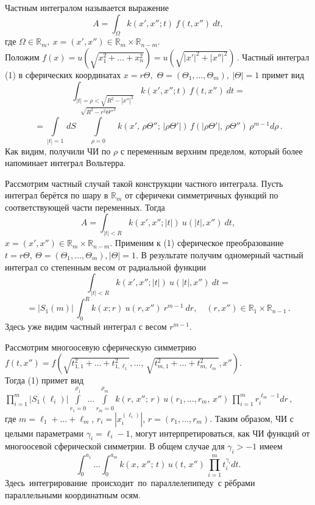 
\vzmscaption

Частным интегралом называется выражение
\begin{equation}\label{1}
A=\int_{\Omega}k(x',x''; t)~f(t,x'')~dt,
\end{equation}
где $\Omega\in\mathbb{R}_m,~x=(x',x'')\in\mathbb{R}_{m}\times\mathbb{R}_{n-m}$.\\
Положим
$
f(x)=u\left(\sqrt{x_1^2+\ldots+x_n^2}\right)=
u\left(\sqrt{|x'|^2+|x''|^2}\right)\,.
$
Частный интеграл (1) в сферических координатах
$ x=r\Theta,$ $\Theta=(\Theta_1,\ldots,\Theta_m),~|\Theta|=1$
примет вид
$$
\int_{|t|=\rho<\sqrt{R^2-|x''|^2}}k(x',x''; t)~f(t,x'')~dt=
$$
$$=
\int\limits_{|t|=1} \,dS\,\,\int\limits_{\rho=0}^{\sqrt{R^2-r^2\Theta''^2}} k(x',\,\rho\Theta'';\, |\rho\Theta'|)\, f(|\rho\Theta'|,\, \rho\Theta'')\, \rho^{m-1} d\rho\,.
$$
Как видим, получили ЧИ по $\rho$ с переменным верхним пределом, который более напоминает интеграл Вольтерра.

Рассмотрим частный случай такой конструкции частного интеграла. Пусть интеграл берётся по шару в $\mathbb{R}_m$ от сферичеки симметричных функций
по соответствующей части переменных. Тогда
$$
A=\int_{|t|<R}k(x',x''; |t|)~u(|t|,x'')~dt,
$$
$x=(x',x'')\in\mathbb{R}_m\times\mathbb{R}_{n-m}$. Применим к (1) сферическое преобразование $t=r\Theta,~\Theta=(\Theta_1,\ldots,\Theta_m), |\Theta|=1$. В результате получим одномерный частный интеграл со степенным весом от радиальной функции
$$
\int_{|t|<R}k(x',x''; |t|)~u(|t|,x'')~dt=
$$
$$=
|S_1(m)|\,\int_0^R k(x; r)~u(r,x'')~r^{m-1}~dr,\quad (r,x'')\in\mathbb{R}_1\times\mathbb{R}_{n-1}\,.
$$
Здесь уже видим частный интеграл с весом $r^{m-1}$.

Рассмотрим многоосевую сферическую симметрию\\
$f(t,x'')=f\left(\sqrt{t_{1,1}^2+\ldots+
t_{1,\ell_1}^2},\ldots,\,\sqrt{t_{m,1}^2+\ldots+
t_{m,\ell_m}^2}, x'' \right).
$\\
Тогда (1) примет вид\\
$
\prod\limits_{i=1}^m |S_1(\ell_i)|\int\limits_{r_1=0}^{\rho_1}\ldots \int\limits_{r_m=0}^{\rho_m} k(r,\,x'';\,r )\, u(r_1,\ldots, r_m,\, x'')\, \prod\limits_{i=1}^m r_i^{\ell_m-1} d r\,,
$ \\
где $m=\ell_1+\ldots+\ell_m$, $r_i=|x_i^{(\ell_i)}|$, $r=(r_1,\ldots,r_m)$.
Таким образом, ЧИ с целыми параметрами $\gamma_i=\ell_i-1$, могут интерпретироваться, как ЧИ функций от многоосевой сферической симметрии.
В общем случае для $\gamma_i>-1$ имеем
$$
\int_{0}^{a_1}\ldots \int_{0}^{a_m} k(x,\,x'';\,t)\, u(t,\, x'')\, \prod\limits_{i=1}^m t_i^{\gamma_i} d t.
$$
Здесь\, интегрирование\, происходит\, по\, параллелепипеду\, с рёбрами параллельными координатным осям.

